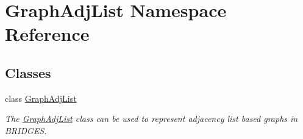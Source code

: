\hypertarget{namespace_graph_adj_list}{}\section{Graph\+Adj\+List Namespace Reference}
\label{namespace_graph_adj_list}
\subsection*{Classes}
\begin{DoxyCompactItemize}
\item 
class \hyperlink{class_graph_adj_list_1_1_graph_adj_list}{Graph\+Adj\+List}
\begin{DoxyCompactList}\small\item\em The \hyperlink{class_graph_adj_list_1_1_graph_adj_list}{Graph\+Adj\+List} class can be used to represent adjacency list based graphs in B\+R\+I\+D\+G\+E\+S. \end{DoxyCompactList}\end{DoxyCompactItemize}
